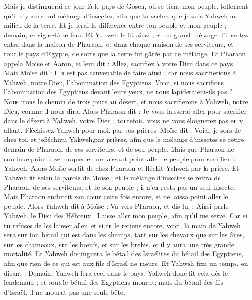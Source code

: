 \begin{multicols}{2}
Mais je distinguerai ce jour-là le pays de Gosen, où se tient mon peuple, tellement qu'il n’y aura nul mélange d'insectes; afin que tu saches que je suis Yahweh au milieu de la terre.
Et je ferai la différence entre ton peuple et mon peuple ; demain, ce signe-là se fera.
Et Yahweh le fit ainsi ; et un grand mélange d'insectes entra dans la maison de Pharaon, et dans chaque maison de ses serviteurs, et tout le pays d'Egypte, de sorte que la terre fut gâtée par ce mélange.
 Et Pharaon appela Moïse et Aaron, et leur dit : Allez,  sacrifiez à votre Dieu dans ce pays.
Mais Moïse dit : Il n'est pas convenable de faire ainsi ; car nous sacrifierions à Yahweh, notre Dieu, l'abomination des Egyptiens. Voici, si nous sacrifions l'abomination des Egyptiens devant leurs yeux, ne nous lapideraient-ils pas ?
Nous irons le chemin de trois jours au désert, et nous sacrifierons à Yahweh, notre Dieu, comme il nous dira.
Alors Pharaon dit : Je vous laisserai aller pour sacrifier dans le désert à Yahweh, votre Dieu ; toutefois, vous ne vous éloignerez pas en y allant. Fléchissez Yahweh pour moi, par vos prières.
Moïse dit : Voici, je sors de chez toi, et jefléchirai Yahweh,par prières, afin que le mélange d'insectes se retire demain de Pharaon, de ses serviteurs, et de son peuple. Mais que Pharaon ne continue point à se moquer en ne laissant point aller le peuple pour sacrifier à Yahweh.
Alors Moïse sortit de chez Pharaon et fléchit Yahweh par la prière.
Et Yahweh fit selon la parole de Moïse ; et le mélange d'insectes se retira de Pharaon, de ses serviteurs, et de son peuple ; il n’en resta pas un seul insecte.
Mais Pharaon endurcit son cœur cette fois encore, et ne laissa point aller le peuple.
\VerseOne{}Alors Yahweh dit à Moïse : Va vers Pharaon, et dis-lui : Ainsi parle Yahweh, le Dieu des Hébreux : Laisse aller mon peuple, afin qu'il me serve.
Car si tu refuses de les laisser aller, et si tu le retiens encore,
voici, la main de Yahweh sera sur ton bétail qui est dans les champs, tant sur les chevaux que sur les ânes, sur les chameaux, sur les bœufs, et sur les brebis, et il y aura une très grande mortalité.
Et Yahweh distinguera le bétail des Israélites du bétail des Egyptiens, afin que rien de ce qui est aux fils d'Israël ne meure.
Et Yahweh fixa un temps, en disant : Demain, Yahweh fera ceci dans le pays.
Yahweh donc fit cela dès le lendemain ; et tout le bétail des Egyptiens mourut; mais du bétail des fils d'Israël, il ne mourut pas une seule bête.

\end{multicols}
